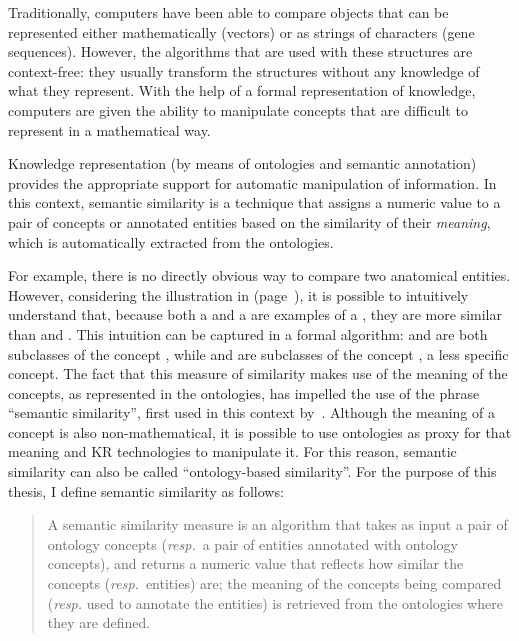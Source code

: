 Traditionally, computers have been able to compare objects that can be represented either mathematically (\eg vectors) or as strings of characters (\eg gene sequences). However, the algorithms that are used with these structures are context-free: they usually transform the structures without any knowledge of what they represent. With the help of a formal representation of knowledge, computers are given the ability to manipulate concepts that are difficult to represent in a mathematical way.

Knowledge representation (by means of ontologies and semantic annotation) provides the appropriate support for automatic manipulation of information. In this context, semantic similarity is a technique that assigns a numeric value to a pair of concepts or annotated entities based on the similarity of their \emph{meaning}, which is automatically extracted from the ontologies.

For example, there is no directly obvious way to compare two anatomical entities. However, considering the illustration in  (page~\pageref{fig:anatomy-ontology}), it is possible to intuitively understand that, because both a  and a  are examples of a , they are more similar than  and . This intuition can be captured in a formal algorithm:  and  are both subclasses of the concept , while  and  are subclasses of the concept , a less specific concept. The fact that this measure of similarity makes use of the meaning of the concepts, as represented in the ontologies, has impelled the use of the phrase ``semantic similarity'', first used in this context by~\citet{Resnik1995}. Although the meaning of a concept is also non-mathematical, it is possible to use ontologies as proxy for that meaning and KR technologies to manipulate it. For this reason, semantic similarity can also be called ``ontology-based similarity''. For the purpose of this thesis, I define semantic similarity as follows:

\begin{quote}
    A semantic similarity measure is an algorithm that takes as input a pair of ontology concepts (\emph{resp.}~a pair of entities annotated with ontology concepts), and returns a numeric value that reflects how similar the concepts (\emph{resp.}~entities) are; the meaning of the concepts being compared (\emph{resp.} used to annotate the entities) is retrieved from the ontologies where they are defined.
\end{quote}

